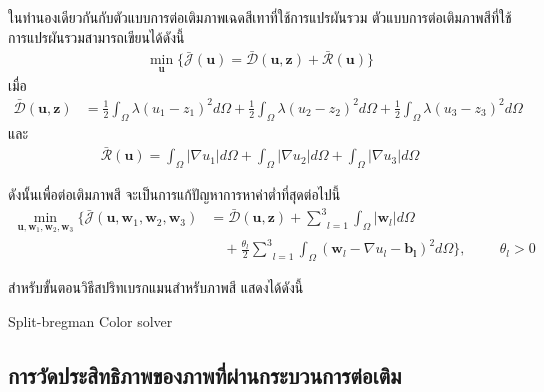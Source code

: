 \documentclass[hidelinks, a4paper,12pt]{article}
\numberwithin{equation}{section}							%
\numberwithin{equation}{section}
\begin{document}
{\hspace{1cm} ในทำนองเดียวกันกับตัวแบบการต่อเติมภาพเฉดสีเทาที่ใช้การแปรผันรวม ตัวแบบการต่อเติมภาพสีที่ใช้การแปรผันรวมสามารถเขียนได้ดังนี้
\begin{align}
\min_{\boldsymbol{u}} \{ \bar{\mathcal{J}}(\boldsymbol{u})= \mathcal{\bar{D}}(\boldsymbol{u},\boldsymbol{z})+  \mathcal{\bar{R}}(\boldsymbol{u}) \}
\label{e10}
\end{align}
เมื่อ
\begin{align*}
\mathcal{\bar{D}}(\boldsymbol{u},\boldsymbol{z}) 
&= \frac{1}{2}\int_{\Omega}^{}\lambda(u_1 - z_1)^2 d\Omega + \frac{1}{2}\int_{\Omega}^{}\lambda(u_2 - z_2)^2 d\Omega + \frac{1}{2}\int_{\Omega}^{}\lambda(u_3 - z_3)^2 d\Omega
\end{align*}
และ 
\begin{align*}
\mathcal{\bar{R}}(\boldsymbol{u})= \int_{\Omega}^{}\lvert\nabla u_1 \rvert d\Omega + \int_{\Omega}^{}\lvert\nabla u_2 \rvert d\Omega + \int_{\Omega}^{}\lvert\nabla u_3 \rvert d\Omega
\end{align*}

\hspace{1cm}  ดังนั้นเพื่อต่อเติมภาพสี จะเป็นการแก้ปัญหาการหาค่าต่ำที่สุดต่อไปนี้ 
\begin{align}
\min_{\boldsymbol{u},\boldsymbol{w}_1,\boldsymbol{w}_2,\boldsymbol{w}_3} \{\bar{\mathcal{J}}(\boldsymbol{u},\boldsymbol{w}_1,\boldsymbol{w}_2,\boldsymbol{w}_3)&= \mathcal{\bar{D}}(\boldsymbol{u},\boldsymbol{z}) +  \underset{l=1}{\overset{3}{\sum}} \int_{\Omega}^{}|\boldsymbol{w}_l|d\Omega
\nonumber\\
&\quad+ \frac{\theta_l}{2} \underset{l=1}{\overset{3}{\sum}}\int_{\Omega}^{}(\boldsymbol{w}_l - \nabla u_l - \boldsymbol{b_l})^{2}d\Omega\}, \hspace{1cm} \theta_l > 0
\end{align}

\vspace{1cm}
สำหรับขั้นตอนวิธีสปริทเบรกแมนสำหรับภาพสี แสดงได้ดังนี้
\begin{algorithm}[H]
	\caption{Split-bregman Color solver}
\end{algorithm}
\vspace{1cm}
\subsection{การวัดประสิทธิภาพของภาพที่ผ่านกระบวนการต่อเติม}

}
\end{document}
